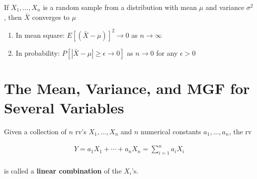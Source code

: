\begin{theorem}
    If $X_1,\dots,X_n$ is a random sample from a distribution with mean $\mu$ and variance $\sigma^2$, then $\bar{X}$ converges to $\mu$ 

    \begin{enumerate}[label=\textbf{\alph*.}]
        \item In mean square: \quad $E[(\bar{X}-\mu)]^2\rightarrow 0$ as $n\rightarrow \infty$
        \item In probability: \quad $P[|\bar{X} - \mu|\geq\epsilon\rightarrow 0]$ as $n\rightarrow 0$ for any $\epsilon > 0$
    \end{enumerate}
\end{theorem}

\section{The Mean, Variance, and MGF for Several Variables}

\begin{definition}
    Given a collection of $n$ rv's $X_1,\dots,X_n$ and $n$ numerical constants $a_1,\dots,a_n$, the rv 

    \begin{align*}
        Y=a_1X_1+\cdots+a_nX_n = \sum_{i=1}^na_iX_i \\
    \end{align*}

    is called a \textbf{linear combination} of the $X_i$'s.
\end{definition}

